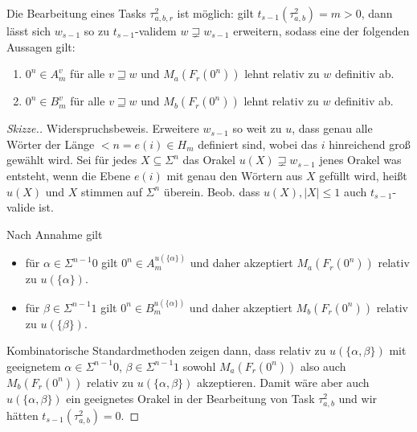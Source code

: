 \begin{lemma}
    Die Bearbeitung eines Tasks $\tau^2_{a,b,r}$ ist möglich: gilt $t_{s-1}(\tau^2_{a,b})=m>0$, dann lässt sich $w_{s-1}$ so zu $t_{s-1}$-validem $w\sqsupsetneq w_{s-1}$ erweitern, sodass eine der folgenden Aussagen gilt:
    \begin{enumerate}[nosep,endpenalty=10000]
        \item $0^n\in A_m^v$ für alle $v\sqsupseteq w$ und $M_a(F_r(0^n))$ lehnt relativ zu $w$ definitiv ab.
        \item $0^n\in B_m^v$ für alle $v\sqsupseteq w$ und $M_b(F_r(0^n))$ lehnt relativ zu $w$ definitiv ab.
    \end{enumerate}
\end{lemma}
\begin{proof}[Skizze.]
    Widerspruchsbeweis. Erweitere $w_{s-1}$ so weit zu $u$, dass genau alle Wörter der Länge $<n=e(i)\in H_m$ definiert sind, wobei das $i$ hinreichend groß gewählt wird. Sei für jedes $X\subseteq \Sigma^n$ das Orakel $u(X)\sqsupsetneq w_{s-1}$ jenes Orakel was entsteht, wenn die Ebene $e(i)$ mit genau den Wörtern aus $X$ gefüllt wird, heißt $u(X)$ und $X$ stimmen auf $\Sigma^n$ überein. Beob. dass $u(X), |X|\leq 1$ auch $t_{s-1}$-valide ist.

    Nach Annahme gilt
    \begin{itemize}[nosep]
        \item für $\alpha\in \Sigma^{n-1}0$ gilt $0^n\in A_m^{u(\{\alpha\})}$ und daher akzeptiert $M_a(F_r(0^n))$ relativ zu $u(\{\alpha\})$.
        \item für $\beta\in \Sigma^{n-1}1$ gilt $0^n\in B_m^{u(\{\alpha\})}$ und daher akzeptiert $M_b(F_r(0^n))$ relativ zu $u(\{\beta\})$.
    \end{itemize}
    Kombinatorische Standardmethoden zeigen dann, dass relativ zu $u(\{\alpha,\beta\})$ mit geeignetem $\alpha\in\Sigma^{n-1}0$, $\beta\in\Sigma^{n-1}1$ sowohl $M_a(F_r(0^n))$ also auch $M_b(F_r(0^n))$ relativ zu $u(\{\alpha,\beta\})$ akzeptieren.
    Damit wäre aber auch $u(\{\alpha,\beta\})$ ein geeignetes Orakel in der Bearbeitung von Task $\tau^2_{a,b}$ und wir hätten $t_{s-1}(\tau^2_{a,b})=0$.
\end{proof}
